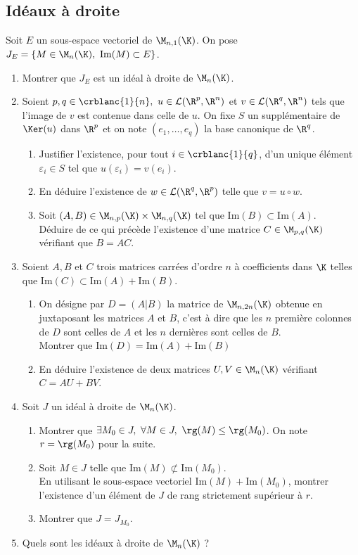 \documentclass[8pt]{book}
\begin{document}
	\subsection{Idéaux à droite }
	Soit $E$ un sous-espace vectoriel de $\M_{n,1}(\K)$. On pose $J_E=\{M\in \M_n(\K),\ \text{Im}(M)\subset E\}$.
	\begin{enumerate}
		\item Montrer que $J_E$ est un idéal à droite de $\M_n(\K)$.
		\item Soient $p,q\in \crblanc{1}{n},\ u\in \mathcal L(\R^p,\R^n)$ et $v\in \mathcal L(\R^q,\R^n)$ tels que l'image de $v$ est contenue dans celle de $u$. On fixe $S$ un supplémentaire de $\Ker(u)$ dans $\R^p$ et on note $(e_1,\dots,e_q)$ la base canonique de $\R^q$.
		\begin{enumerate}[label=\alph*.]
			\item Justifier l'existence, pour tout $i\in \crblanc{1}{q}$, d'un unique élément $\varepsilon_i\in S$ tel que $u(\varepsilon_i)=v(e_i)$.
			\item En déduire l'existence de $w\in \mathcal L(\R^q,\R^p)$ telle que $v=u\circ w$.
			\item Soit $(A,B)\in \M_{n,p}(\K)\times\M_{n,q}(\K)$ tel que $\text{Im}(B)\subset \text{Im}(A)$.\\
			Déduire de ce qui précède l'existence d'une matrice $C\in \M_{p,q}(\K)$ vérifiant que $B=AC$.
		\end{enumerate}
		\item Soient $A,B$ et $C$ trois matrices carrées d'ordre $n$ à coefficients dans $\K$ telles que $\text{Im}(C)\subset\text{Im}(A)+\text{Im}(B)$.
		\begin{enumerate}[label=\alph*.]
			\item On désigne par $D=(A|B)$ la matrice de $\M_{n,2n}(\K)$ obtenue en juxtaposant les matrices $A$ et $B$, c'est à dire que les $n$ première colonnes de $D$ sont celles de $A$ et les $n$ dernières sont celles de $B$.\\
			Montrer que $\text{Im}(D)=\text{Im}(A)+\text{Im}(B)$
			\item En déduire l'existence de deux matrices $U,V\in \M_n(\K)$ vérifiant $C=AU+BV$.
		\end{enumerate}
		\item Soit $J$ un idéal à droite de $\M_n(\K)$.
		\begin{enumerate}[label=\alph*.]
			\item Montrer que $\exists M_0\in J,\ \forall M\in J,\ \rg(M)\leq\rg(M_0)$. On note $r=\rg(M_0)$ pour la suite.
			\item Soit $M\in J$ telle que $\text{Im}(M)\not\subset \text{Im}(M_0)$.\\
			En utilisant le sous-espace vectoriel $\text{Im}(M)+\text{Im}(M_0)$, montrer l'existence d'un élément de $J$ de rang strictement supérieur à $r$.
			\item Montrer que $J=J_{M_0}$.
		\end{enumerate}
		\item Quels sont les idéaux à droite de $\M_n(\K)$ ?
	\end{enumerate}
	
\end{document}
